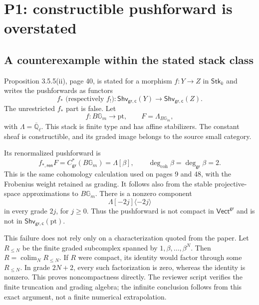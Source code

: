 \documentclass[10pt]{article}
\begin{document}
\section*{P1: constructible pushforward is overstated}
\subsection*{A counterexample within the stated stack class}
Proposition 3.5.5(ii), page 40, is stated for a morphism \(f:Y\to Z\) in \(\mathsf{Stk}_k\) and writes the pushforwards as functors \[f_* \text{ (respectively }f_!\text{)}:
\mathsf{Shv}_{\mathsf{gr},\mathsf c}(Y)\longrightarrow\mathsf{Shv}_{\mathsf{gr},\mathsf c}(Z).\] The unrestricted \(f_*\) part is false. Let \[f:B\mathbb G_m\longrightarrow\mathrm{pt},\qquad
F=\Lambda_{B\mathbb G_m},\] with \(\Lambda=\overline{\mathbb Q}_\ell\). This stack is finite type and has affine stabilizers. The constant sheaf is constructible, and its graded image belongs to the source small category.\par
Its renormalized pushforward is \[f_{*,\mathsf{ren}}F=C^*_{\mathsf{gr}}(B\mathbb G_m)=\Lambda[\beta],
\qquad \deg_{\mathrm{coh}}\beta=\deg_{\mathsf{gr}}\beta=2.\] This is the same cohomology calculation used on pages 9 and 48, with the Frobenius weight retained as grading. It follows also from the stable projective-space approximations to \(B\mathbb G_m\). There is a nonzero component \[\Lambda[-2j]\langle-2j\rangle\] in every grade \(2j\), for \(j\geq0\). Thus the pushforward is not compact in \(\mathsf{Vect}^{\mathsf{gr}}\) and is not in \(\mathsf{Shv}_{\mathsf{gr},\mathsf c}(\mathrm{pt})\).\par
This failure does not rely only on a characterization quoted from the paper. Let \(R_{\leq N}\) be the finite graded subcomplex spanned by \(1,\beta,\ldots,\beta^N\). Then \(R=\operatorname*{colim}_N R_{\leq N}\). If \(R\) were compact, its identity would factor through some \(R_{\leq N}\). In grade \(2N+2\), every such factorization is zero, whereas the identity is nonzero. This proves noncompactness directly. The reviewer script verifies the finite truncation and grading algebra; the infinite conclusion follows from this exact argument, not a finite numerical extrapolation.\par
\end{document}
